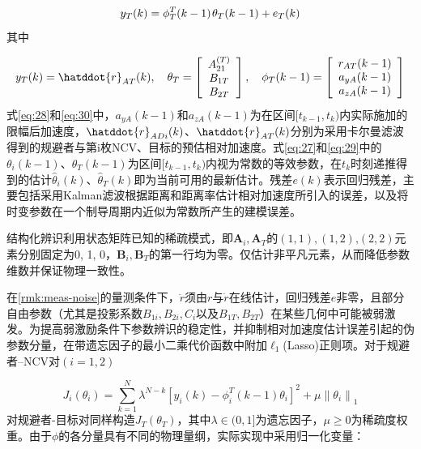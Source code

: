 \begin{equation}
\label{eq:29}
{y_T}(k) = \phi _T^T(k - 1){\kern 1pt} {\theta _T}(k - 1) + {e_T}(k)
\end{equation}
其中

\begin{equation}
\label{eq:30}
{y_T}(k) = \hatddot{r}_{AT}(k),\quad {\theta _T} = \left[ {\begin{array}{*{20}{c}}
  {A_{21}^{(T)}} \\ 
  {{B_{1T}}} \\ 
  {{B_{2T}}} 
\end{array}} \right],\quad {\phi _T}(k - 1) = \left[ {\begin{array}{*{20}{c}}
  {{r_{AT}}(k - 1)} \\ 
  {{a_{yA}}(k - 1)} \\ 
  {{a_{zA}}(k - 1)} 
\end{array}} \right]
\end{equation}
式\eqref{eq:28}和\eqref{eq:30}中，${a_{yA}}(k - 1)$和${a_{zA}}(k - 1)$为在区间$[{t_{k - 1}},{t_k})$内实际施加的限幅后加速度，$\hatddot{r}_{ADi}(k)$、$\hatddot{r}_{AT}(k)$分别为采用卡尔曼滤波得到的规避者与第i枚NCV、目标的预估相对加速度。式\eqref{eq:27}和\eqref{eq:29}中的${\theta _i}(k - 1)$、${\theta _T}(k - 1)$为区间$[{t_{k - 1}},{t_k})$内视为常数的等效参数，在${t_k}$时刻递推得到的估计$\hat{\theta}_{i}(k)$、$\hat{\theta}_{T}(k)$即为当前可用的最新估计。残差$e(k)$表示回归残差，主要包括采用Kalman滤波根据距离和距离率估计相对加速度所引入的误差，以及将时变参数在一个制导周期内近似为常数所产生的建模误差。

结构化辨识利用状态矩阵已知的稀疏模式，即${{\mathbf{A}}_i},{{\mathbf{A}}_T}$的$(1,1),(1,2){\text{,}}(2,2)$元素分别固定为0, 1, 0，${{\mathbf{B}}_i},{{\mathbf{B}}_T}$的第一行均为零。仅估计非平凡元素，从而降低参数维数并保证物理一致性。

在\cref{rmk:meas-noise}的量测条件下，$\ddot r$须由$r$与$\dot r$在线估计，回归残差$e$非零，且部分自由参数（尤其是投影系数${B_{1i}},{B_{2i}},{C_i}$以及${B_{1T}},{B_{2T}}$）在某些几何中可能被弱激发。为提高弱激励条件下参数辨识的稳定性，并抑制相对加速度估计误差引起的伪参数分量，在带遗忘因子的最小二乘代价函数中附加${\ell _1}$(Lasso)正则项。对于规避者–NCV对$(i = 1,2)$

\begin{equation}
\label{eq:31}
{J_i}({\theta _i}) = \sum\limits_{k = 1}^N {{\lambda ^{N - k}}} {\left[ {{y_i}(k) - \phi _i^T(k - 1){\theta _i}} \right]^2} + \mu {\left\| {{\theta _i}} \right\|_1}
\end{equation}
对规避者-目标对同样构造${J_T}({\theta _T})$，其中$\lambda  \in (0,1]$为遗忘因子，$\mu  \geqslant 0$为稀疏度权重。由于$\phi $的各分量具有不同的物理量纲，实际实现中采用归一化变量：

